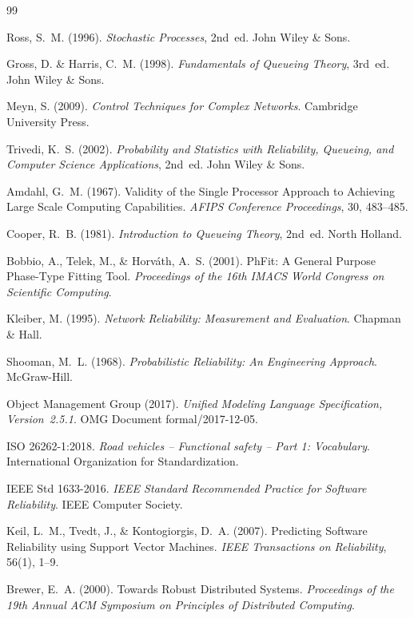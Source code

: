 \documentclass[a4paper,11pt]{article}
\theoremstyle{definition}
\begin{document}
\begin{thebibliography}{99}

    Ross, S.~M. (1996).
    \textit{Stochastic Processes}, 2nd~ed.
    John Wiley \& Sons.

    Gross, D. \& Harris, C.~M. (1998).
    \textit{Fundamentals of Queueing Theory}, 3rd~ed.
    John Wiley \& Sons.

    Meyn, S. (2009).
    \textit{Control Techniques for Complex Networks}.
    Cambridge University Press.

    Trivedi, K.~S. (2002).
    \textit{Probability and Statistics with Reliability, Queueing,
    and Computer Science Applications}, 2nd~ed.
    John Wiley \& Sons.

    Amdahl, G.~M. (1967).
    Validity of the Single Processor Approach to Achieving Large Scale Computing Capabilities.
    \textit{AFIPS Conference Proceedings}, 30, 483--485.

    Cooper, R.~B. (1981).
    \textit{Introduction to Queueing Theory}, 2nd~ed.
    North Holland.

    Bobbio, A., Telek, M., \& Horváth, A.~S. (2001).
    PhFit: A General Purpose Phase-Type Fitting Tool.
    \textit{Proceedings of the 16th IMACS World Congress on Scientific Computing}.

    Kleiber, M. (1995).
    \textit{Network Reliability: Measurement and Evaluation}.
    Chapman \& Hall.

    Shooman, M.~L. (1968).
    \textit{Probabilistic Reliability: An Engineering Approach}.
    McGraw-Hill.

    Object Management Group (2017).
    \textit{Unified Modeling Language Specification, Version~2.5.1}.
    OMG Document formal/2017-12-05.

    ISO 26262-1:2018.
    \textit{Road vehicles -- Functional safety -- Part 1: Vocabulary}.
    International Organization for Standardization.

    IEEE Std 1633-2016.
    \textit{IEEE Standard Recommended Practice for Software Reliability}.
    IEEE Computer Society.

    Keil, L.~M., Tvedt, J., \& Kontogiorgis, D.~A. (2007).
    Predicting Software Reliability using Support Vector Machines.
    \textit{IEEE Transactions on Reliability}, 56(1), 1--9.

    Brewer, E.~A. (2000).
    Towards Robust Distributed Systems.
    \textit{Proceedings of the 19th Annual ACM Symposium on Principles of Distributed Computing}.

\end{thebibliography}
\end{document}
